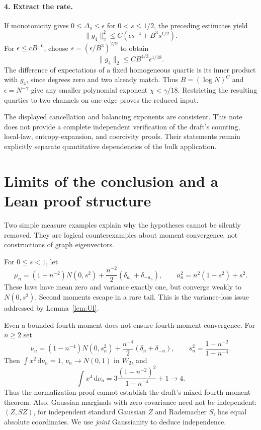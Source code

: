 \documentclass[11pt]{article}
\numberwithin{equation}{section}
\theoremstyle{definition}
\theoremstyle{remark}
\newcommand{\dd}{\,\mathrm d}
\begin{document}
\paragraph{4. Extract the rate.}
If monotonicity gives $0\leq\Delta_s\leq\epsilon$ for
$0<s\leq1/2$, the preceding estimates yield
\[
 \|g_4\|_2^2\leq C(\epsilon s^{-4}+B^3s^{1/2}).
\]
For $\epsilon\leq cB^{-6}$, choose
$s=(\epsilon/B^3)^{2/9}$ to obtain
\[
 \|g_4\|_2\leq CB^{4/3}\epsilon^{1/18}.
\]
The difference of expectations of a fixed homogeneous quartic is its
inner product with $g_4$, since degrees zero and two already match.
Thus $B=(\log N)^C$ and $\epsilon=N^{-\gamma}$ give any smaller
polynomial exponent $\chi<\gamma/18$. Restricting the resulting
quartics to two channels on one edge proves the reduced input.

The displayed cancellation and balancing exponents are consistent.
This note does not provide a complete independent verification of the
draft's counting, local-law, entropy-expansion, and coercivity proofs.
Their statements remain explicitly separate quantitative dependencies
of the bulk application.

\section{Limits of the conclusion and a Lean proof structure}\label{sec:lean}
Two simple measure examples explain why the hypotheses cannot be
silently removed. They are logical counterexamples about moment
convergence, not constructions of graph eigenvectors.

For $0\leq s<1$, let
\[
 \mu_n=(1-n^{-2})N(0,s^2)
       +\frac{n^{-2}}2(\delta_{a_n}+\delta_{-a_n}),\qquad
 a_n^2=n^2(1-s^2)+s^2.
\]
These laws have mean zero and variance exactly one, but converge weakly
to $N(0,s^2)$. Second moments escape in a rare tail. This is the
variance-loss issue addressed by Lemma~\ref{lem:UI}.

Even a bounded fourth moment does not ensure fourth-moment convergence.
For $n\geq2$ set
\[
 \nu_n=(1-n^{-4})N(0,s_n^2)
       +\frac{n^{-4}}2(\delta_n+\delta_{-n}),\qquad
 s_n^2=\frac{1-n^{-2}}{1-n^{-4}}.
\]
Then $\int x^2\dd\nu_n=1$, $\nu_n\to N(0,1)$ in $W_2$, and
\[
 \int x^4\dd\nu_n
 =3\frac{(1-n^{-2})^2}{1-n^{-4}}+1\longrightarrow4.
\]
Thus the normalization proof cannot establish the draft's mixed
fourth-moment theorem. Also, Gaussian marginals with zero covariance
need not be independent: $(Z,SZ)$, for independent standard Gaussian
$Z$ and Rademacher $S$, has equal absolute coordinates. We use
\emph{joint} Gaussianity to deduce independence.
\end{document}
